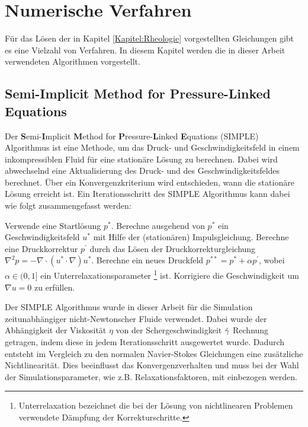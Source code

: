 \section{Numerische Verfahren}
\label{Kapitel:Numerik}
Für das Lösen der in Kapitel \ref{Kapitel:Rheologie} vorgestellten Gleichungen gibt es eine Vielzahl von Verfahren. In diesem Kapitel werden die in dieser Arbeit verwendeten Algorithmen vorgestellt.
%
\subsection{Semi-Implicit Method for Pressure-Linked Equations}
Der \textbf{S}emi-\textbf{I}mplicit \textbf{M}ethod for \textbf{P}ressure-\textbf{L}inked \textbf{E}quations (SIMPLE) Algorithmus \cite{cfd} ist eine Methode, um das Druck- und Geschwindigkeitsfeld in einem inkompressiblen Fluid für eine stationäre Lösung zu berechnen.
Dabei wird abwechselnd eine Aktualisierung des Druck- und des Ge\-schwin\-dig\-keits\-feldes berechnet. Über ein Konvergenzkriterium wird entschieden, wann die stationäre Lösung erreicht ist.
Ein Iterationsschritt des SIMPLE Algorithmus kann dabei wie folgt zusammengefasst werden:
%
\begin{outline}[enumerate]
    \1 Verwende eine Startlösung $p^*$.
    \1 Berechne ausgehend von $p^*$ ein Geschwindigkeitsfeld $u^*$ mit Hilfe der (stationären) Impulsgleichung.
    \1 Berechne eine Druckkorrektur $p^{'}$ durch das Lösen der Druckkorrekturgleichung $\nabla^2p=-\nabla \cdot \left( u^*\cdot\nabla \right)u^*$.
    \1 Berechne ein neues Druckfeld $p^{**}=p^*+\alpha p^{'}$, wobei $\alpha \in (0,1]$ ein Unterrelaxationsparameter \footnote{Unterrelaxation bezeichnet die bei der Lösung von nichtlinearen Problemen verwendete Dämpfung der Korrekturschritte.} ist.
    \1 Korrigiere die Geschwindigkeit um $\nabla u=0$ zu erfüllen.
\end{outline}

Der SIMPLE Algorithmus wurde in dieser Arbeit für die Simulation zeitunabhängiger nicht-Newtonscher Fluide verwendet. Dabei wurde der Ab\-hän\-gig\-keit der Viskosität $\eta$ von der Schergeschwindigkeit $\dot\gamma$ Rechnung getragen, indem diese in jedem Iterationsschritt ausgewertet wurde. Dadurch ent\-steht im Vergleich zu den normalen Navier-Stokes Gleichungen eine zu\-sätz\-liche Nichtlinearität. Dies beeinflusst das Konvergenzverhalten und muss bei der Wahl der Simulationsparameter, wie z.B. Relaxationsfaktoren, mit einbezogen werden.

